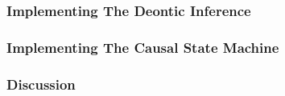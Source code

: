 \subsubsection{Implementing The Deontic Inference}
\label{sec:implementation_inference}


\subsubsection{Implementing The Causal State Machine}
\label{sec:implementation_csm}


\subsubsection{Discussion}
\label{sec:implementation_discussion}


\newpage